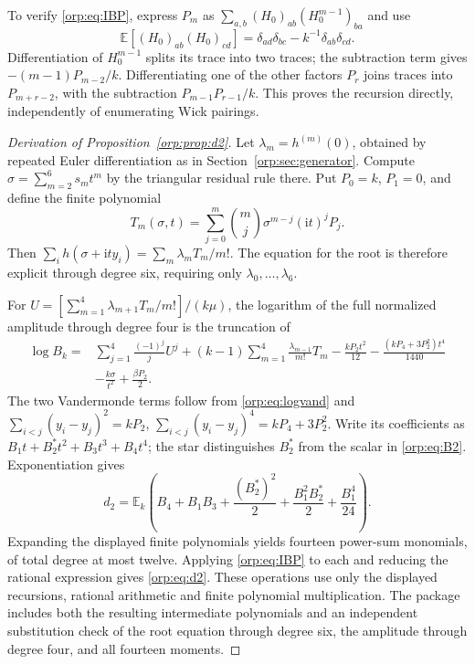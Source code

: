 \documentclass[11pt]{article}
\theoremstyle{remark}\newtheorem{remark}[theorem]{Remark}
\newcommand{\E}{\mathbb E}
\newcommand{\ii}{\mathrm i}
\begin{document}
To verify \eqref{orp:eq:IBP}, express $P_m$ as $\sum_{a,b}(H_0)_{ab}(H_0^{m-1})_{ba}$ and use
\[
 \E[(H_0)_{ab}(H_0)_{cd}]=\delta_{ad}\delta_{bc}-k^{-1}\delta_{ab}\delta_{cd}.
\]
Differentiation of $H_0^{m-1}$ splits its trace into two traces; the subtraction term gives $-(m-1)P_{m-2}/k$. Differentiating one of the other factors $P_r$ joins traces into $P_{m+r-2}$, with the subtraction $P_{m-1}P_{r-1}/k$. This proves the recursion directly, independently of enumerating Wick pairings.

\begin{proof}[Derivation of Proposition~\ref{orp:prop:d2}]
Let $\lambda_m=h^{(m)}(0)$, obtained by repeated Euler differentiation as in Section~\ref{orp:sec:generator}. Compute $\sigma=\sum_{m=2}^6s_mt^m$ by the triangular residual rule there. Put $P_0=k$, $P_1=0$, and define the finite polynomial
\[
 T_m(\sigma,t)=\sum_{j=0}^m\binom mj\sigma^{m-j}(\ii t)^jP_j.
\]
Then $\sum_i h(\sigma+\ii t y_i)=\sum_m\lambda_m T_m/m!$. The equation for the root is therefore explicit through degree six, requiring only $\lambda_0,\ldots,\lambda_6$.

For $U=[\sum_{m=1}^4\lambda_{m+1}T_m/m!]/(k\mu)$, the logarithm of the full normalized amplitude through degree four is the truncation of
\begin{align*}
 \log B_k={}&\sum_{j=1}^4\frac{(-1)^j}{j}U^j
 +(k-1)\sum_{m=1}^4\frac{\lambda_{m-1}}{m!}T_m
 -\frac{kP_2t^2}{12}-\frac{(kP_4+3P_2^2)t^4}{1440}\\
 &-\frac{k\sigma}{t^2}+\frac{\beta P_2}{2}.
\end{align*}
The two Vandermonde terms follow from \eqref{orp:eq:logvand} and
$\sum_{i<j}(y_i-y_j)^2=kP_2$,
$\sum_{i<j}(y_i-y_j)^4=kP_4+3P_2^2$.
Write its coefficients as $B_1t+B_2^*t^2+B_3t^3+B_4t^4$; the star distinguishes $B_2^*$ from the scalar in \eqref{orp:eq:B2}. Exponentiation gives
\begin{equation}\label{orp:eq:secondfinite}
 d_2=\E_k\left(B_4+B_1B_3+\frac{(B_2^*)^2}{2}
                   +\frac{B_1^2B_2^*}{2}+\frac{B_1^4}{24}\right).
\end{equation}
Expanding the displayed finite polynomials yields fourteen power-sum monomials, of total degree at most twelve. Applying \eqref{orp:eq:IBP} to each and reducing the rational expression gives \eqref{orp:eq:d2}. These operations use only the displayed recursions, rational arithmetic and finite polynomial multiplication. The package includes both the resulting intermediate polynomials and an independent substitution check of the root equation through degree six, the amplitude through degree four, and all fourteen moments.
\end{proof}
\end{document}
